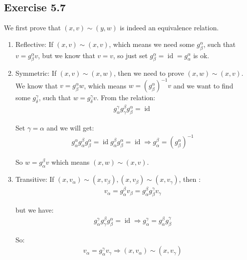 \documentclass[]{ctexart}
\begin{document}
	\subsection{Exercise 5.7}
		We first prove that $(x,v)\sim (y,w)$ is indeed an equivalence relation. 
			\begin{enumerate}
				\item Reflective: If $ (x,v)\sim (x,v) $, which means we need some $g^{\alpha}_{\beta}$, such that$ v=g^{\alpha}_{\beta}v $, but we know that $v=v$, so just set $g^{\alpha}_{\beta}=\operatorname{id}=g^{\alpha}_{\alpha}$ is ok.
				\item Symmetric: If $(x,v)\sim (x,w)$, then we need to prove $(x,w)\sim (x,v)$. We know that $ v=g^{\alpha}_{\beta}w $, which means $ w=(g^{\alpha}_{\beta})^{-1}v $ and we want to find some $g^{\gamma}_{\delta}$, such that $ w=g^{\gamma}_{\delta}v $. From the relation:
					\begin{equation*}
					\begin{aligned}
						g^{\gamma}_{\alpha}g^{\beta}_{\gamma}g^{\alpha}_{\beta}=\operatorname{id}
					\end{aligned}
					\end{equation*}
					
					Set $\gamma =\alpha$ and we will get:
					\begin{equation*}
					\begin{aligned}
					g^{\alpha}_{\alpha}g^{\beta}_{\alpha}g^{\alpha}_{\beta}=\operatorname{id}g^{\beta}_{\alpha}g^{\alpha}_{\beta}=\operatorname{id}\Rightarrow g^{\beta}_{\alpha}=(g^{\alpha}_{\beta})^{-1}
					\end{aligned}
					\end{equation*}
					
					So $ w= g^{\beta}_{\alpha}v $ which means $(x,w)\sim (x,v)$. 
					\item Transitive: If $(x,v_{\alpha})\sim (x,v_{\beta}),(x,v_{\beta})\sim (x,v_{\gamma})$, then :
						\begin{equation*}
						\begin{aligned}
							v_{\alpha}=g^{\beta}_{\alpha}v_{\beta}=g^{\beta}_{\alpha}g^{\gamma}_{\beta}v_{\gamma}
						\end{aligned}
						\end{equation*}
					
					but we have:
						\begin{equation*}
						\begin{aligned}
							g_{\alpha}^{\gamma} g_{\gamma}^{\beta} g_{\beta}^{\alpha}=\operatorname{id}\Rightarrow g_{\alpha}^{\gamma}=g^{\beta}_{\alpha}g^{\gamma}_{\beta}
						\end{aligned}
						\end{equation*}
						
					So:
						\begin{equation*}
						\begin{aligned}
						v_{\alpha}=g_{\alpha}^{\gamma}v_{\gamma}\Rightarrow (x,v_{\alpha})\sim (x,v_{\gamma})
						\end{aligned}
						\end{equation*}
			\end{enumerate}
		
\end{document}
